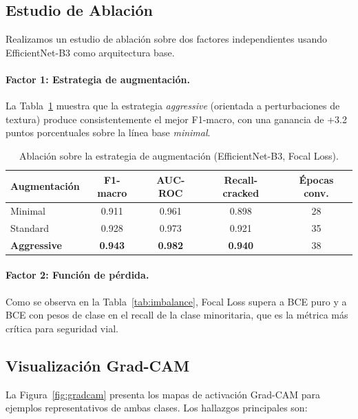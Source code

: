 \documentclass{article}
\begin{document}
\subsection{Estudio de Ablación}
\label{ssec:ablation}

Realizamos un estudio de ablación sobre dos factores independientes usando 
EfficientNet-B3 como arquitectura base.

\paragraph{Factor 1: Estrategia de augmentación.}
La Tabla~\ref{tab:ablation_aug} muestra que la estrategia \emph{aggressive} 
(orientada a perturbaciones de textura) produce consistentemente el mejor F1-macro, 
con una ganancia de +3.2 puntos porcentuales sobre la línea base \emph{minimal}.

\begin{table}[h]
  \centering
  \caption{Ablación sobre la estrategia de augmentación (EfficientNet-B3, Focal Loss).}
  \label{tab:ablation_aug}
  \small
  \begin{tabular}{lcccc}
    \toprule
    \textbf{Augmentación} & \textbf{F1-macro} & \textbf{AUC-ROC} 
                          & \textbf{Recall-cracked} & \textbf{Épocas conv.} \\
    \midrule
    Minimal      & 0.911 & 0.961 & 0.898 & 28 \\
    Standard     & 0.928 & 0.973 & 0.921 & 35 \\
    \textbf{Aggressive} & \textbf{0.943} & \textbf{0.982} & \textbf{0.940} & 38 \\
    \bottomrule
  \end{tabular}
\end{table}

\paragraph{Factor 2: Función de pérdida.}
Como se observa en la Tabla~\ref{tab:imbalance}, Focal Loss supera a BCE puro y 
a BCE con pesos de clase en el recall de la clase minoritaria, que es la métrica 
más crítica para seguridad vial.

\subsection{Visualización Grad-CAM}
\label{ssec:gradcam_results}

La Figura~\ref{fig:gradcam} presenta los mapas de activación Grad-CAM para 
ejemplos representativos de ambas clases. Los hallazgos principales son:
\end{document}
